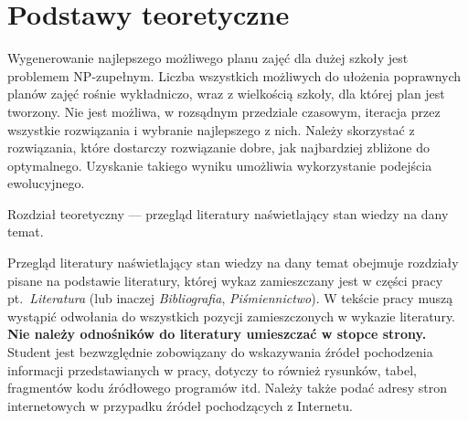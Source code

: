 
\chapter{Podstawy teoretyczne}
Wygenerowanie najlepszego możliwego planu zajęć dla dużej szkoły jest problemem NP-zupełnym. Liczba wszystkich możliwych do ułożenia poprawnych planów zajęć rośnie wykładniczo, wraz z wielkością szkoły, dla której plan jest tworzony. Nie jest możliwa, w rozsądnym przedziale czasowym, iteracja przez wszystkie rozwiązania i wybranie najlepszego z nich. Należy skorzystać z rozwiązania, które dostarczy rozwiązanie dobre, jak najbardziej zbliżone do optymalnego. Uzyskanie takiego wyniku umożliwia wykorzystanie podejścia ewolucyjnego.

Rozdział teoretyczny --- przegląd literatury naświetlający stan wiedzy na dany temat. 

Przegląd literatury naświetlający stan wiedzy na dany temat obejmuje rozdziały pisane na podstawie
literatury, której wykaz zamieszczany jest w części pracy pt.~\emph{Literatura} (lub inaczej \emph{Bibliografia},
\emph{Piśmiennictwo}). W tekście pracy muszą wystąpić odwołania do wszystkich pozycji zamieszczonych w
wykazie literatury. \textbf{Nie należy odnośników do literatury umieszczać w stopce strony.} Student jest
bezwzględnie zobowiązany do wskazywania źródeł pochodzenia informacji przedstawianych w pracy,
dotyczy to również rysunków, tabel, fragmentów kodu źródłowego programów itd. Należy także podać
adresy stron internetowych w przypadku źródeł pochodzących z Internetu.


